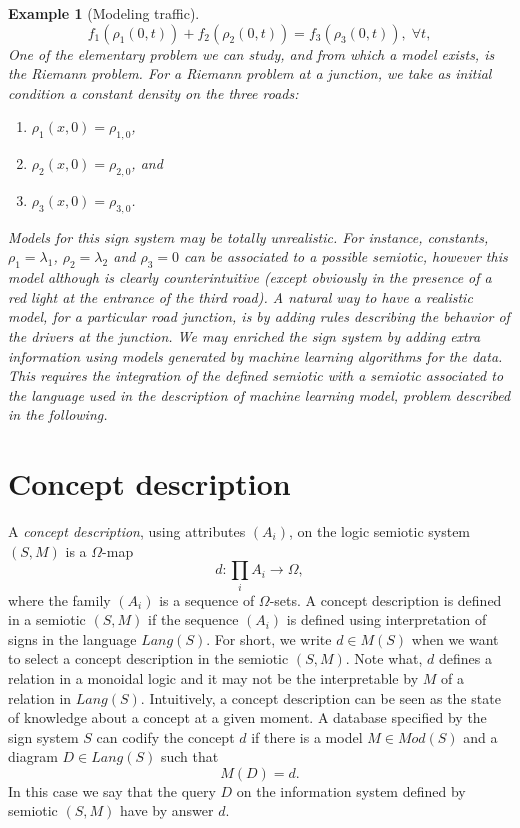 \documentclass[oribibl]{llncs}
\newtheorem{exam}{Example}
\begin{document}
\begin{exam}[Modeling traffic]
\[
f_1(\rho_1(0,t))+f_2(\rho_2(0,t))=f_3(\rho_3(0,t)),\;\forall t,
\]
One of the elementary problem we can study, and from which a model exists, is the Riemann problem. For a Riemann problem at a junction, we take as initial condition a constant density on the three roads:
\begin{enumerate}
  \item $\rho_1(x,0)=\rho_{1,0}$,
  \item $\rho_2(x,0)=\rho_{2,0}$, and
  \item $\rho_3(x,0)=\rho_{3,0}$.
\end{enumerate}

Models for this sign system may be totally unrealistic. For instance, constants,  $\rho_1 = \lambda_1$, $\rho_2 = \lambda_2$ and $\rho_3 = 0$ can be associated to a possible semiotic, however this model although is clearly counterintuitive (except obviously in the presence of a red light at the entrance of the third road). A natural way to have a realistic model, for a particular road junction, is by adding rules describing the behavior of the drivers at the junction. We may enriched the sign system by adding extra information using models generated by machine learning algorithms for the data. This requires the integration of the defined semiotic with a semiotic associated to the language used in the description of machine learning model, problem described in the following.
\end{exam}



\section{Concept description}\label{Concept description}
 A \emph{concept description}, using attributes $(A_i)$,  on the logic semiotic system $(S,M)$ is a $\Omega$-map
\[d:\prod_i A_i\rightarrow\Omega,\]
where the family $(A_i)$ is a sequence of $\Omega$-sets. A concept description is defined in a semiotic $(S,M)$ if the sequence $(A_i)$ is defined using interpretation of signs in the language $Lang(S)$. For short, we write $d\in M(S)$ when we  want to select a concept description in the semiotic $(S,M)$. Note what, $d$ defines a relation in a monoidal logic and it may not be the interpretable by $M$ of a relation in $Lang(S)$. Intuitively, a concept description can be seen as the state of knowledge about a concept at a given moment. A database specified by the sign system $S$ can codify the concept $d$ if there is a model $M\in Mod(S)$ and a diagram $D\in Lang(S)$ such that
\[M(D)=d.\]
In this case  we say that the query $D$ on the information system defined by semiotic $(S,M)$ have by answer $d$.
\end{document}
